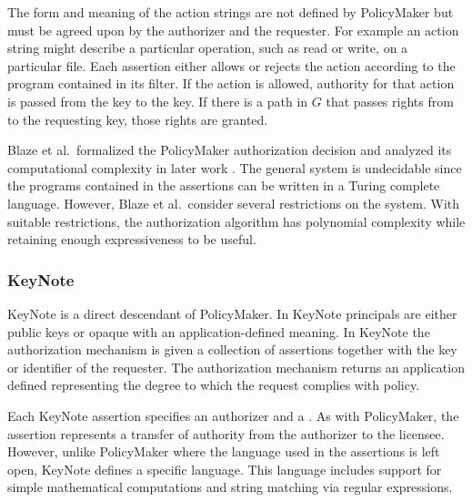 The form and meaning of the action strings are not defined by PolicyMaker
but must be agreed upon by the authorizer and the requester. For example an
action string might describe a particular operation, such as read or write,
on a particular file. Each assertion either allows or rejects the action
according to the program contained in its filter. If the action is allowed,
authority for that action is passed from the  key to the
 key. If there is a path in $G$ that passes rights
from  to the requesting key, those rights are granted.

Blaze et al.~formalized the PolicyMaker authorization decision and
analyzed its computational complexity in later work
\cite{Blaze:CCPTMS}. The general system is undecidable since the
programs contained in the assertions can be written in a Turing complete
language. However, Blaze et al.~consider several restrictions on the
system. With suitable restrictions, the authorization algorithm has
polynomial complexity while retaining enough expressiveness to be useful.

\subsubsection{KeyNote}

KeyNote \cite{RFC-2704,Blaze:RTMDSS} is a direct descendant of PolicyMaker. In
KeyNote principals are either public keys or opaque  with an application-defined meaning. In KeyNote the authorization
mechanism is given a collection of assertions together with the key or
identifier of the requester. The authorization mechanism returns an
application defined  representing the degree
to which the request complies with policy.

Each KeyNote assertion specifies an authorizer and a . As
with PolicyMaker, the assertion represents a transfer of authority from the
authorizer to the licensee. However, unlike PolicyMaker where the language
used in the assertions is left open, KeyNote defines a specific language.
This language includes support for simple mathematical computations and
string matching via regular expressions.


